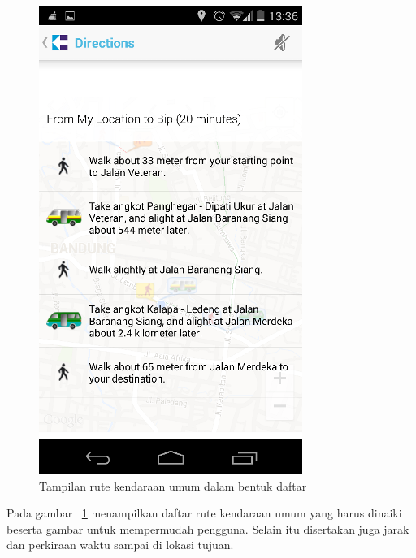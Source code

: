 \begin{figure}[h]
	\centering
		\includegraphics[scale=0.5]{Gambar/KIRI_Android/tampilan_daftar}
	\caption{Tampilan rute kendaraan umum dalam bentuk daftar}
	\label{fig:daftar}
\end{figure}

Pada gambar ~\ref{fig:daftar} menampilkan daftar rute kendaraan umum yang harus dinaiki beserta gambar untuk mempermudah pengguna. Selain itu disertakan juga jarak dan perkiraan waktu sampai di lokasi tujuan.


